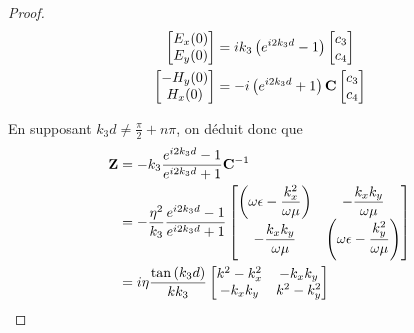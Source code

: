 \begin{proof}
            \begin{align}
                \begin{bmatrix}
                    E_x(0)\\
                    E_y(0)\\
                \end{bmatrix}
                &=ik_3\left( e^{i2k_3 d} -1 \right)
                \begin{bmatrix}
                    c_3 \\
                    c_4
                \end{bmatrix} \\
                \begin{bmatrix}
                    -H_y(0)\\
                    H_x(0)\\
                \end{bmatrix}
                & = - i\left(e^{i2k_3 d} +1 \right)
                \mathbf{C}
                \begin{bmatrix}
                c_3 \\
                c_4
                \end{bmatrix}
            \end{align}

            En supposant $k_3d \not = \frac{\pi}{2} + n\pi$, on déduit donc que
            \begin{align}
                \mathbf{Z} &=  - k_3 \dfrac{e^{i2k_3d} -1}{e^{i2k_3d} +1} \mathbf{C}^{-1} 
                \\
                &= -\dfrac{\eta^2}{k_3} \dfrac{e^{i2k_3d} -1}{e^{i2k_3d} +1}
                    \begin{bmatrix}
                       \left(\omega\epsilon-\dfrac{k_x^2}{\omega\mu}\right)  & -\dfrac{k_xk_y}{\omega\mu}\\
                        -\dfrac{k_xk_y}{\omega\mu} &  \left(\omega\epsilon-\dfrac{k_y^2}{\omega\mu}\right)
                    \end{bmatrix}
                \\
                &= i\eta\dfrac{\tan\left(k_3d\right)}{kk_3}
                    \begin{bmatrix}
                       k^2-k_x^2  & -k_xk_y\\
                        -k_xk_y & k^2-k_y^2\\
                    \end{bmatrix}
            \end{align}

        \end{proof}

